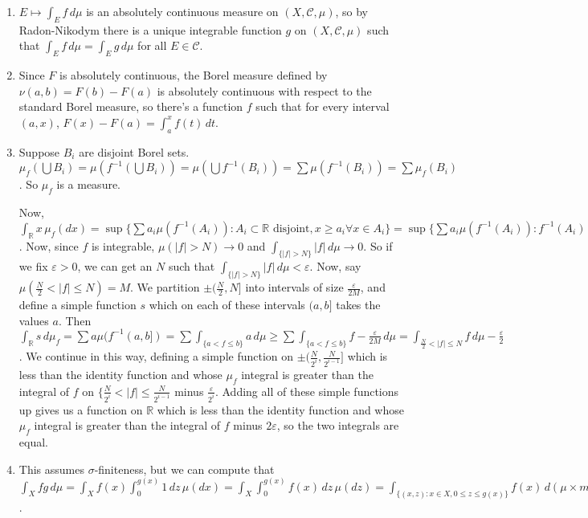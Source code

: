 \documentclass{article}
\newcommand\RR{\mathbb R}
\newcommand\C{\mathscr C}
\begin{document}
\begin{enumerate}
  \item $E \mapsto \int_E f \,d\mu$ is an absolutely continuous measure on
     $(X,\C,\mu)$, so by Radon-Nikodym there is a unique integrable function $g$
     on $(X,\C,\mu)$ such that $\int_E f \,d\mu = \int_E g \, d\mu$ for all $E
     \in \C$.
      
   \item Since $F$ is absolutely continuous, the Borel measure defined by
      $\nu(a,b) = F(b) - F(a)$ is absolutely continuous with respect to the
      standard Borel measure, so there's a function $f$ such that for every
      interval $(a,x)$, $F(x) - F(a) = \int_a^x f(t) \, dt$.

   \item Suppose $B_i$ are disjoint Borel sets. $\mu_f(\bigcup B_i) =
      \mu(f^{-1}(\bigcup B_i)) = \mu(\bigcup f^{-1}(B_i)) = \sum
      \mu(f^{-1}(B_i)) = \sum \mu_f(B_i)$. So $\mu_f$ is a measure.

      Now, $\int_\RR x\,\mu_f(dx) = \sup\{\sum a_i \mu(f^{-1}(A_i)) : A_i
      \subset \RR \textrm{ disjoint}, x \geq a_i \forall x \in A_i \} =
      \sup\{\sum a_i \mu(f^{-1}(A_i)) : f^{-1}(A_i) \subset X \textrm{ disjoint},
      f(x) \geq a_i \forall x \in f^{-1}(A_i)\} \leq \int_X f \, d\mu$. Now,
      since $f$ is integrable, $\mu(|f|>N) \to 0$ and $\int_{\{|f|>N\}}
      |f|\,d\mu \to 0$. So if we fix $\varepsilon>0$, we can get an $N$ such
      that $\int_{\{|f|>N\}} |f|\,d\mu < \varepsilon$. Now, say $\mu(\frac N2 <
      |f| \leq N) = M$. We partition $\pm(\frac N2,N]$ into intervals of size
      $\frac\varepsilon{2M}$, and define a simple function $s$ which on each of
      these intervals $(a,b]$ takes the values $a$. Then $\int_\RR s\,d\mu_f =
      \sum a \mu(f^{-1}(a,b]) = \sum \int_{\{a<f\leq b\}} a\,d\mu \geq \sum
      \int_{\{a<f\leq b\}} f-\frac\varepsilon{2M}\,d\mu = \int_{\frac N2<|f|\leq
      N} f \,d\mu - \frac\varepsilon2$. We continue in this way, defining a
      simple function on $\pm(\frac{N}{2^i},\frac{N}{2^{i-1}}]$ which is less
      than the identity function and whose $\mu_f$ integral is greater than the
      integral of $f$ on $\{\frac{N}{2^i}<|f|\leq\frac{N}{2^{i-1}}$ minus
      $\frac\varepsilon{2^i}$.  Adding all of these simple functions up gives us
      a function on $\RR$ which is less than the identity function and whose
      $\mu_f$ integral is greater than the integral of $f$ minus $2\varepsilon$,
      so the two integrals are equal.

   \item This assumes $\sigma$-finiteness, but we can compute that $\int_X
      fg\,d\mu = \int_X f(x) \int_0^{g(x)} 1 \,dz\,\mu(dx) = \int_X
      \int_0^{g(x)} f(x) \,dz\,\mu(dz) = \int_{\{(x,z):x \in X, 0 \leq z \leq
      g(x)\}} f(x) \,d(\mu \times m) = \int_0^\infty \int_{\{g \geq z\}} f
      \,d\mu\,dz$.


\end{enumerate}
\end{document}
